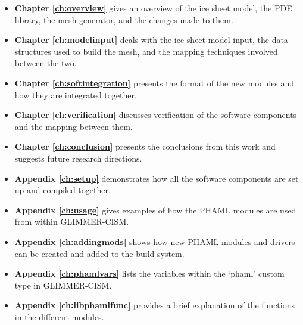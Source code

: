 \begin{itemize}

\item \textbf{Chapter \ref{ch:overview}} gives an overview of the ice sheet model, the PDE library, the mesh generator, and the changes made to them.

\item \textbf{Chapter \ref{ch:modelinput}} deals with the ice sheet model input, the data structures used to build the mesh, and the mapping techniques involved between the two.     

\item \textbf{Chapter \ref{ch:softintegration}} presents the format of the new modules and how they are integrated together.

\item \textbf{Chapter \ref{ch:verification}} discusses verification of the software components and the mapping between them.

\item \textbf{Chapter \ref{ch:conclusion}} presents the conclusions from this work and suggests future research directions.

\item \textbf{Appendix \ref{ch:setup}} demonstrates how all the software components are set up and compiled together.

\item \textbf{Appendix \ref{ch:usage}} gives examples of how the PHAML modules are used from within GLIMMER-CISM.

\item \textbf{Appendix \ref{ch:addingmods}} shows how new PHAML modules and drivers can be created and added to the build system.  

\item \textbf{Appendix \ref{ch:phamlvars}} lists the variables within the `phaml' custom type in GLIMMER-CISM.

\item \textbf{Appendix \ref{ch:libphamlfunc}} provides a brief explanation of the functions in the different modules.
\end{itemize}


